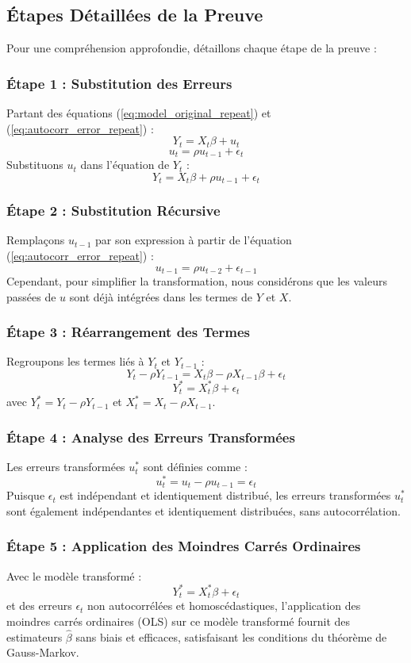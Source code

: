 \documentclass[14pt]{extarticle} %
\theoremstyle{definition}
\theoremstyle{plain}
\begin{document}
\subsection{Étapes Détaillées de la Preuve}
Pour une compréhension approfondie, détaillons chaque étape de la preuve :

\subsubsection{Étape 1 : Substitution des Erreurs}
Partant des équations (\ref{eq:model_original_repeat}) et (\ref{eq:autocorr_error_repeat}) :
\[
Y_t = X_t \beta + u_t
\]
\[
u_t = \rho u_{t-1} + \epsilon_t
\]
Substituons \( u_t \) dans l'équation de \( Y_t \) :
\[
Y_t = X_t \beta + \rho u_{t-1} + \epsilon_t
\]

\subsubsection{Étape 2 : Substitution Récursive}
Remplaçons \( u_{t-1} \) par son expression à partir de l'équation (\ref{eq:autocorr_error_repeat}) :
\[
u_{t-1} = \rho u_{t-2} + \epsilon_{t-1}
\]
Cependant, pour simplifier la transformation, nous considérons que les valeurs passées de \( u \) sont déjà intégrées dans les termes de \( Y \) et \( X \).

\subsubsection{Étape 3 : Réarrangement des Termes}
Regroupons les termes liés à \( Y_t \) et \( Y_{t-1} \) :
\[
Y_t - \rho Y_{t-1} = X_t \beta - \rho X_{t-1} \beta + \epsilon_t
\]
\[
Y_t^* = X_t^* \beta + \epsilon_t
\]
avec \( Y_t^* = Y_t - \rho Y_{t-1} \) et \( X_t^* = X_t - \rho X_{t-1} \).

\subsubsection{Étape 4 : Analyse des Erreurs Transformées}
Les erreurs transformées \( u_t^* \) sont définies comme :
\[
u_t^* = u_t - \rho u_{t-1} = \epsilon_t
\]
Puisque \( \epsilon_t \) est indépendant et identiquement distribué, les erreurs transformées \( u_t^* \) sont également indépendantes et identiquement distribuées, sans autocorrélation.

\subsubsection{Étape 5 : Application des Moindres Carrés Ordinaires}
Avec le modèle transformé :
\[
Y_t^* = X_t^* \beta + \epsilon_t
\]
et des erreurs \( \epsilon_t \) non autocorrélées et homoscédastiques, l'application des moindres carrés ordinaires (OLS) sur ce modèle transformé fournit des estimateurs \( \hat{\beta} \) sans biais et efficaces, satisfaisant les conditions du théorème de Gauss-Markov.
\end{document}
